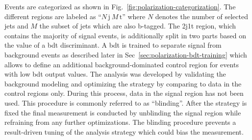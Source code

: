 Events are categorized as shown in Fig.~\ref{fig:polarization-categorization}. The different regions are labeled as ``$N\,\mathrm{j}~M\,\mathrm{t}$'' where $N$ denotes the number of selected jets and $M$ the subset of jets which are also b-tagged. The 2j1t region, which contains the majority of signal events, is additionally split in two parts based on the value of a \gls{bdt} discriminant. A \gls{bdt} is trained to separate signal from background events as described later in Sec~\ref{sec:polarization-bdt-training} which allows to define an additional background-dominated control region for events with low \gls{bdt} output values. The analysis was developed by validating the background modeling and optimizing the strategy by comparing to data in the control regions only. During this process, data in the signal region has not been used. This procedure is commonly referred to as ``blinding''. After the strategy is fixed the final measurement is conducted by unblinding the signal region while refraining from any further optimizations. The blinding procedure prevents a result-driven tuning of the analysis strategy which could bias the measurement.


